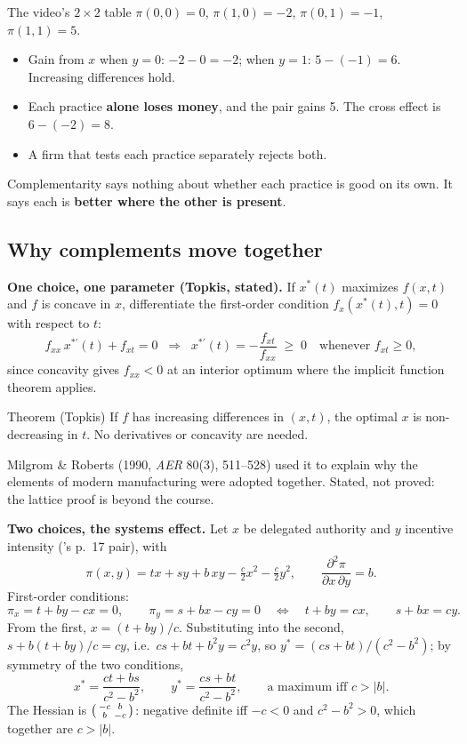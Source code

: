 \begin{example}{The video's $2\times 2$ table}
$\pi(0,0)=0$, $\pi(1,0)=-2$, $\pi(0,1)=-1$, $\pi(1,1)=5$.
\begin{itemize}
  \item Gain from $x$ when $y=0$: $-2 - 0 = -2$; when $y = 1$: $5 - (-1) = 6$. Increasing
    differences hold.
  \item Each practice \textbf{alone loses money}, and the pair gains 5. The cross effect is
    $6 - (-2) = 8$.
  \item A firm that tests each practice separately rejects both.
\end{itemize}
\end{example}

\begin{keyidea}
Complementarity says nothing about whether each practice is good on its own. It says each is
\textbf{better where the other is present}.
\end{keyidea}

\subsection{Why complements move together}\label{sec:a1-move}

\textbf{One choice, one parameter (Topkis, stated).} If $x^*(t)$ maximizes $f(x, t)$ and $f$ is
concave in $x$, differentiate the first-order condition $f_x(x^*(t), t) = 0$ with respect to $t$:
\[
  f_{xx}\, x^{*\prime}(t) + f_{xt} = 0 \;\;\Longrightarrow\;\;
  x^{*\prime}(t) = -\frac{f_{xt}}{f_{xx}} \;\ge\; 0 \quad\text{whenever } f_{xt} \ge 0 ,
\]
since concavity gives $f_{xx} < 0$ at an interior optimum where the implicit function theorem
applies.

\begin{prop}{Theorem (Topkis)}
If $f$ has increasing differences in $(x, t)$, the optimal $x$ is non-decreasing in $t$. No
derivatives or concavity are needed.
\end{prop}

Milgrom \& Roberts (1990, \emph{AER} 80(3), 511--528) used it to explain why the elements of modern
manufacturing were adopted together. Stated, not proved: the lattice proof is beyond the course.

\textbf{Two choices, the systems effect.} Let $x$ be delegated authority and $y$ incentive
intensity (\MR's p.~17 pair), with
\[
  \pi(x, y) = t x + s y + b\, x y - \tfrac{c}{2} x^2 - \tfrac{c}{2} y^2, \qquad
  \frac{\partial^2 \pi}{\partial x\, \partial y} = b .
\]
First-order conditions:
\[
  \pi_x = t + b y - c x = 0, \qquad \pi_y = s + b x - c y = 0
  \quad\Longleftrightarrow\quad t + b y = c x, \qquad s + b x = c y .
\]
From the first, $x = (t + b y)/c$. Substituting into the second, $s + b(t + by)/c = cy$, i.e.\
$cs + bt + b^2 y = c^2 y$, so $y^* = (cs + bt)/(c^2 - b^2)$; by symmetry of the two conditions,
\[
  x^* = \frac{c t + b s}{c^2 - b^2}, \qquad y^* = \frac{c s + b t}{c^2 - b^2}, \qquad
  \text{a maximum iff } c > |b| .
\]
The Hessian is $\begin{psmallmatrix} -c & b \\ b & -c \end{psmallmatrix}$: negative definite iff
$-c < 0$ and $c^2 - b^2 > 0$, which together are $c > |b|$.

